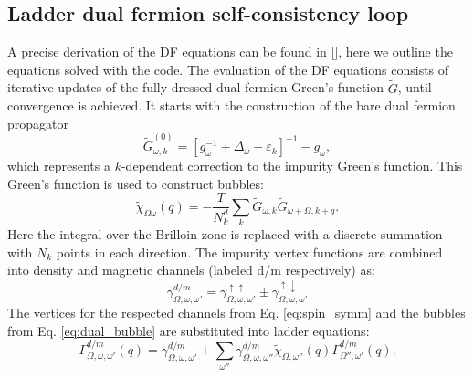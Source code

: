 \documentclass[3p,times,procedia]{elsarticle}
\begin{document}
\subsection{Ladder dual fermion self-consistency loop}
A precise derivation of the DF equations can be found in [], here we outline the equations solved with the code. The evaluation of the DF equations consists of iterative updates of the fully dressed dual fermion Green's function $\tilde G$, until convergence is achieved. It starts with the construction of the bare dual fermion propagator
\begin{equation}
\tilde G^{(0)}_{\omega,k} = \left[g_{\omega}^{-1} + \Delta_\omega - \varepsilon_k\right]^{-1} - g_{\omega}, \label{eq:gd0}
\end{equation}
which represents a $k$-dependent correction to the impurity Green's function. This Green's function is used to construct bubbles: 
\begin{equation}\label{eq:dual_bubble}
\tilde \chi_{\Omega\omega}(q) = -\frac{T}{N_k^d} \sum_k \tilde G_{\omega, k} \tilde G_{\omega + \Omega, k+q}.
\end{equation}
Here the integral over the Brilloin zone is replaced with a discrete summation with $N_k$ points in each direction. The impurity vertex functions are combined into density and magnetic channels (labeled d/m respectively) as: 
\begin{equation}\label{eq:spin_symm}
\gamma^{d/m}_{\Omega,\omega,\omega'} = \gamma^{\uparrow\uparrow}_{\Omega,\omega,\omega'} \pm \gamma^{\uparrow\downarrow}_{\Omega,\omega,\omega'}
\end{equation}
The vertices for the respected channels from Eq. \ref{eq:spin_symm} and the bubbles from Eq. \ref{eq:dual_bubble} are substituted into ladder equations:
\begin{equation}\label{eq:dual_ladder}
\Gamma^{d/m}_{\Omega,\omega,\omega'}(q) = \gamma^{d/m}_{\Omega,\omega,\omega'} + \sum_{\omega''} \gamma^{d/m}_{\Omega,\omega,\omega''} \tilde\chi_{\Omega,\omega''}(q) \Gamma^{d/m}_{\Omega'',\omega'}(q).
\end{equation}
\end{document}
